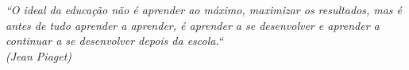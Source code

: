 \begin{epigrafe}
    \vspace*{\fill}
    \hspace{.35\textwidth}
    {\begin{minipage}{.6\textwidth}
    	\begin{flushright}
            \textit{``O ideal da educação não é aprender ao máximo, maximizar os resultados, mas é antes de tudo aprender a aprender, é aprender a se desenvolver e aprender a continuar a se desenvolver depois da escola.``\\
                (Jean Piaget)}
        \end{flushright}
    \end{minipage}}%

\end{epigrafe}
